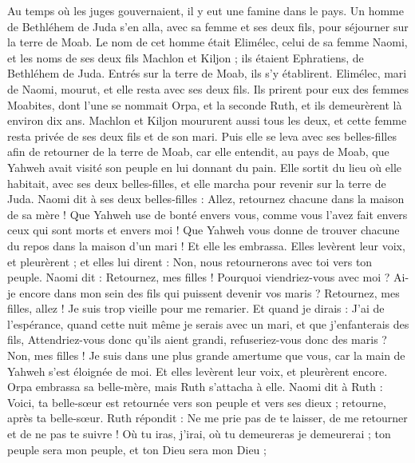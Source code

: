 \begin{multicols}{2}
\VerseOne{}Au temps où les juges gouvernaient, il y eut une famine dans le pays. Un homme de Bethléhem de Juda s'en alla, avec sa femme et ses deux fils, pour séjourner sur la terre de Moab.
Le nom de cet homme était Elimélec, celui de sa femme Naomi, et les noms de ses deux fils Machlon et Kiljon ; ils étaient Ephratiens, de Bethléhem de Juda. Entrés sur la terre de Moab, ils s’y établirent.
Elimélec, mari de Naomi, mourut, et elle resta avec ses deux fils.
Ils prirent pour eux des femmes Moabites, dont l'une se nommait Orpa, et la seconde Ruth, et ils demeurèrent là environ dix ans.
Machlon et Kiljon moururent aussi tous les deux, et cette femme resta privée de ses deux fils et de son mari.
Puis elle se leva avec ses belles-filles afin de retourner de la terre de Moab, car elle entendit, au pays de Moab, que Yahweh avait visité son peuple en lui donnant du pain.
Elle sortit du lieu où elle habitait, avec ses deux belles-filles, et elle marcha pour revenir sur la terre de Juda.
Naomi dit à ses deux belles-filles : Allez, retournez chacune dans la maison de sa mère ! Que Yahweh use de bonté envers vous, comme vous l'avez fait envers ceux qui sont morts et envers moi !
Que Yahweh vous donne de trouver chacune du repos dans la maison d'un mari ! Et elle les embrassa. Elles levèrent leur voix, et pleurèrent ;
et elles lui dirent : Non, nous retournerons avec toi vers ton peuple.
Naomi dit : Retournez, mes filles ! Pourquoi viendriez-vous avec moi ? Ai-je encore dans mon sein des fils qui puissent devenir vos maris ?
Retournez, mes filles, allez ! Je suis trop vieille pour me remarier. Et quand je dirais : J'ai de l'espérance, quand cette nuit même je serais avec un mari, et que j'enfanterais des fils,
Attendriez-vous donc qu'ils aient grandi, refuseriez-vous donc des maris ? Non, mes filles ! Je suis dans une plus grande amertume que vous, car la main de Yahweh s'est éloignée de moi.
Et elles levèrent leur voix, et pleurèrent encore. Orpa embrassa sa belle-mère, mais Ruth s’attacha à elle.
Naomi dit à Ruth : Voici, ta belle-sœur est retournée vers son peuple et vers ses dieux ; retourne, après ta belle-sœur.
Ruth répondit : Ne me prie pas de te laisser, de me retourner et de ne pas te suivre ! Où tu iras, j'irai, où tu demeureras je demeurerai ; ton peuple sera mon peuple, et ton Dieu sera mon Dieu ;

\end{multicols}
